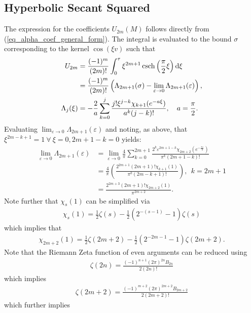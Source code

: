 \subsection{Hyperbolic Secant Squared}
The expression for the coefficients $U_{2m}(M)$
follows directly from
(\ref{eq_alpha_coef_general_form}).  The integral is
evaluated to the bound $\sigma$ corresponding to the kernel
$\cos(\xi v)$ such that
\begin{align}
	U_{2m} &= \frac{(-1)^m}{(2m)!}
	\int_0^{\tau} \xi^{2m+1} \operatorname{csch}\left(\frac{\pi}{2} \xi\right) \mathrm{d}\xi \\
	&=\frac{(-1)^m}{(2m)!}\left(
	\Lambda_{2m+1}(\sigma) - \lim_{\varepsilon \to 0} \Lambda_{2m+1}(\varepsilon)
	\right), \\
	\Lambda_j(\xi) &= -\frac{2}{a}\sum_{k=0}^{j}
	\frac{j! \xi^{j-k} \chi_{k+1}(e^{-a\xi})}{a^k (j-k)!},\quad a = \frac{\pi}{2}.\nonumber
\end{align}
Evaluating $\lim_{\varepsilon \to 0} \Lambda_{2m+1}(\varepsilon)$ and noting, as above,
that $\xi^{2m-k+1} = 1\ \forall\ \xi = 0, 2m+1-k = 0$ yields:
\begin{align}
	\lim_{\varepsilon \to 0} \Lambda_{2m+1}(\varepsilon) 
	    &= \lim_{\varepsilon \to 0} \frac{4}{\pi}
	        \sum_{k=0}^{2m+1} \frac{2^k \varepsilon^{2m+1-k}
	        	\chi_{2m+2}\left(e^{-\frac{\pi \varepsilon}{2}}\right)}
	        {\pi^{k}(2m+1-k)!} \\
	    &= \frac{4}{\pi}
	       \left(\frac{2^{2m+1}(2m+1)!\chi_{k+1}(1)}{\pi^k (2m-k+1)!}\right),\ \ k = 2m+1 \\
	    &= \frac{2^{2m+3}(2m+1)!\chi_{2m+2}(1)}{\pi^{2m+2}}.
\end{align}
Note further that $\chi_s(1)$ can be simplified via
\begin{align}
	\chi_s(1) = \frac{1}{2}\zeta(s) - \frac{1}{2}\left(2^{-(s-1)}-1\right)\zeta(s)
\end{align}
which implies that
\begin{align}
	\chi_{2m+2}(1) = \frac{1}{2}\zeta(2m+2) - \frac{1}{2}\left(2^{-2m-1}-1\right)\zeta(2m+2).
\end{align}
Note that the Riemann Zeta function of even arguments can be reduced using
\begin{align}
	\zeta(2n) = \frac{(-1)^{n+1}(2\pi)^{2n}B_{2n}}{2(2n)!}
\end{align}
which implies
\begin{align}
\zeta(2m+2) = \frac{(-1)^{m+2}(2\pi)^{2m+2}B_{2m+2}}{2(2m+2)!}
\end{align}
which further implies
